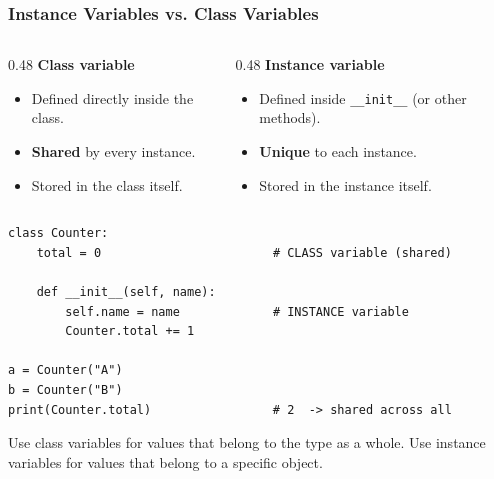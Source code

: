 \documentclass[aspectratio=169,10pt]{beamer}
\newcommand{\keyword}[1]{\textcolor{PrimaryBlue}{\textbf{#1}}}
\newcommand{\codeword}[1]{\texttt{#1}}
\newenvironment{bluebox}[1]{%
  \vspace{0.08cm}\begin{tcolorbox}[lecturebox,title={#1},fontupper=\small]%
}{\end{tcolorbox}\vspace{0.05cm}}
\begin{document}
\begin{frame}[fragile]
\frametitle{Instance Variables vs. Class Variables}
\small
\begin{columns}[T,totalwidth=0.96\textwidth]
\begin{column}{0.48\textwidth}
\textbf{Class variable}
\begin{itemize}\setlength\itemsep{0.04cm}
  \item Defined directly inside the class.
  \item \keyword{Shared} by every instance.
  \item Stored in the class itself.
\end{itemize}
\end{column}
\begin{column}{0.48\textwidth}
\textbf{Instance variable}
\begin{itemize}\setlength\itemsep{0.04cm}
  \item Defined inside \codeword{\_\_init\_\_} (or other methods).
  \item \keyword{Unique} to each instance.
  \item Stored in the instance itself.
\end{itemize}
\end{column}
\end{columns}

\vspace{0.18cm}
\begin{lstlisting}[style=pycode]
class Counter:
    total = 0                        # CLASS variable (shared)

    def __init__(self, name):
        self.name = name             # INSTANCE variable
        Counter.total += 1

a = Counter("A")
b = Counter("B")
print(Counter.total)                 # 2  -> shared across all
\end{lstlisting}

\begin{bluebox}{Rule of thumb}
Use class variables for values that belong to the type as a whole. Use instance variables for values that belong to a specific object.
\end{bluebox}
\end{frame}
\end{document}
